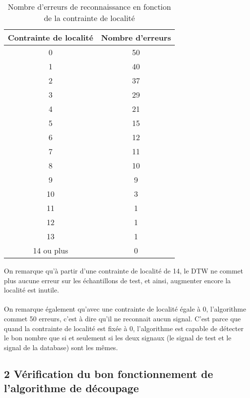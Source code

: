 \documentclass[a4paper,11pt]{article}
\begin{document}
\label{tableau}

\begin{center}


\begin{table}[H]

\begin{tabular}{|c|c|}

\hline
Contrainte de localité & Nombre d'erreurs \\
\hline
0 & 50 \\
\hline
1 & 40 \\
\hline
2 & 37 \\
\hline
3 & 29 \\
\hline
4 & 21 \\
\hline
5 & 15 \\
\hline
6 & 12 \\
\hline
7 & 11 \\
\hline
8 & 10 \\
\hline
9 & 9 \\
\hline
10 & 3 \\
\hline
11 & 1 \\
\hline
12 & 1 \\
\hline
13 & 1 \\
\hline
14 ou plus & 0 \\
\hline



\end{tabular}
\caption{Nombre d'erreurs de reconnaissance en fonction de la contrainte de localité\protect\footnotemark[2]}
 
\end{table}
\end{center}

On remarque qu'à partir d'une contrainte de localité de 14, le DTW ne commet plus aucune erreur sur les échantillons de test, et ainsi, augmenter encore la localité est inutile.
\\
\\
On remarque également qu'avec une contrainte de localité égale à 0, l'algorithme commet 50 erreurs, c'est à dire qu'il ne reconnait aucun signal. C'est parce que quand la contrainte de localité est fixée à 0, l'algorithme est capable de détecter le bon nombre que si et seulement si les deux signaux (le signal de test et le signal de la database) sont les mêmes.
\subsection*{2  Vérification du bon fonctionnement de l'algorithme de découpage}
\end{document}
